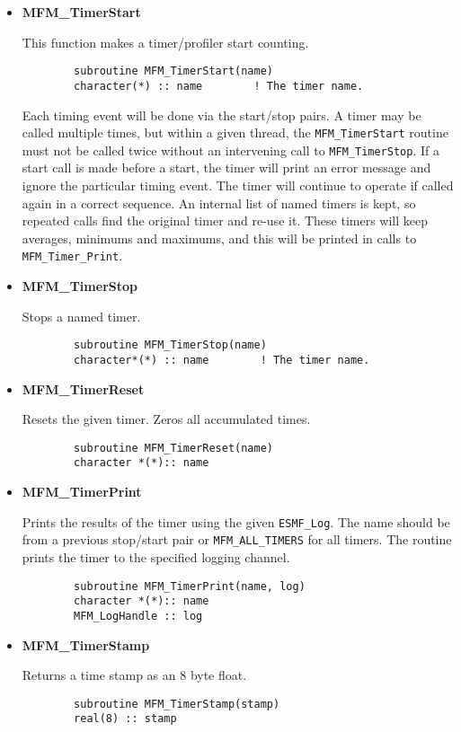 \begin{itemize}
\begin{itemize}
\end{itemize}

\item{\bf MFM\_TimerStart}

This function makes a timer/profiler start counting.

\begin{verbatim}
        subroutine MFM_TimerStart(name)
        character(*) :: name        ! The timer name.
\end{verbatim}

Each timing event will be done via the start/stop pairs.  A timer may be called
multiple times, but within a given thread, the {\tt MFM\_TimerStart} routine
must not be called twice without an intervening call to {\tt MFM\_TimerStop}.
If a start call is made before a start, the timer will print an error
message and ignore the particular timing event.  The timer will continue to operate
if called again in a correct sequence.
An internal list of named  timers is kept, so repeated calls find the original
timer and re-use it.  These timers will keep averages, minimums and maximums,
and this will be printed in calls to {\tt MFM\_Timer\_Print}.

\item{\bf MFM\_TimerStop}

Stops a named timer.
\begin{verbatim}
        subroutine MFM_TimerStop(name)
        character*(*) :: name        ! The timer name.
\end{verbatim}

\item{\bf MFM\_TimerReset}

Resets the given timer.  Zeros all accumulated times.

\begin{verbatim}
        subroutine MFM_TimerReset(name)
        character *(*):: name
\end{verbatim}

\item{\bf MFM\_TimerPrint}

Prints the results of the timer using the given {\tt ESMF\_Log}.  The name should be
from a previous stop/start pair or {\tt MFM\_ALL\_TIMERS} for all timers.  The routine prints
the timer to the specified logging channel.

\begin{verbatim}
        subroutine MFM_TimerPrint(name, log)
        character *(*):: name
        MFM_LogHandle :: log
\end{verbatim}

\item{\bf MFM\_TimerStamp}

Returns a time stamp as an 8 byte float.  

\begin{verbatim}
        subroutine MFM_TimerStamp(stamp)
        real(8) :: stamp
\end{verbatim}


\end{itemize}
